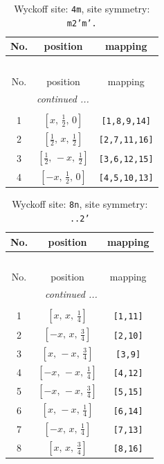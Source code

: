 \documentclass[fleqn,8pt]{jsarticle}
\begin{document}
\renewcommand{\arraystretch}{1.2}
\begin{longtable}{ccc}
\caption{Wyckoff site: {\tt 4m}, site symmetry: {\tt m2'm'.}}
 \\
 \hline \hline
No. & position & mapping \\ \hline \endfirsthead

\multicolumn{2}{l}{\tablename\ \thetable{}} \\
 \hline \hline
No. & position & mapping \\ \hline \endhead

 \hline \hline
\multicolumn{2}{r}{\footnotesize\it continued ...} \\ \endfoot

 \hline \hline
\multicolumn{2}{r}{} \\ \endlastfoot

1 & $\left[ x,\, \frac{1}{2},\, 0 \right]$ & {\tt [1,8,9,14]} \\ \hline
2 & $\left[ \frac{1}{2},\, x,\, \frac{1}{2} \right]$ & {\tt [2,7,11,16]} \\ \hline
3 & $\left[ \frac{1}{2},\, - x,\, \frac{1}{2} \right]$ & {\tt [3,6,12,15]} \\ \hline
4 & $\left[ - x,\, \frac{1}{2},\, 0 \right]$ & {\tt [4,5,10,13]} \\
\end{longtable}
\renewcommand{\arraystretch}{1.2}
\begin{longtable}{ccc}
\caption{Wyckoff site: {\tt 8n}, site symmetry: {\tt ..2'}}
 \\
 \hline \hline
No. & position & mapping \\ \hline \endfirsthead

\multicolumn{2}{l}{\tablename\ \thetable{}} \\
 \hline \hline
No. & position & mapping \\ \hline \endhead

 \hline \hline
\multicolumn{2}{r}{\footnotesize\it continued ...} \\ \endfoot

 \hline \hline
\multicolumn{2}{r}{} \\ \endlastfoot

1 & $\left[ x,\, x,\, \frac{1}{4} \right]$ & {\tt [1,11]} \\ \hline
2 & $\left[ - x,\, x,\, \frac{3}{4} \right]$ & {\tt [2,10]} \\ \hline
3 & $\left[ x,\, - x,\, \frac{3}{4} \right]$ & {\tt [3,9]} \\ \hline
4 & $\left[ - x,\, - x,\, \frac{1}{4} \right]$ & {\tt [4,12]} \\ \hline
5 & $\left[ - x,\, - x,\, \frac{3}{4} \right]$ & {\tt [5,15]} \\ \hline
6 & $\left[ x,\, - x,\, \frac{1}{4} \right]$ & {\tt [6,14]} \\ \hline
7 & $\left[ - x,\, x,\, \frac{1}{4} \right]$ & {\tt [7,13]} \\ \hline
8 & $\left[ x,\, x,\, \frac{3}{4} \right]$ & {\tt [8,16]} \\
\end{longtable}
\end{document}
